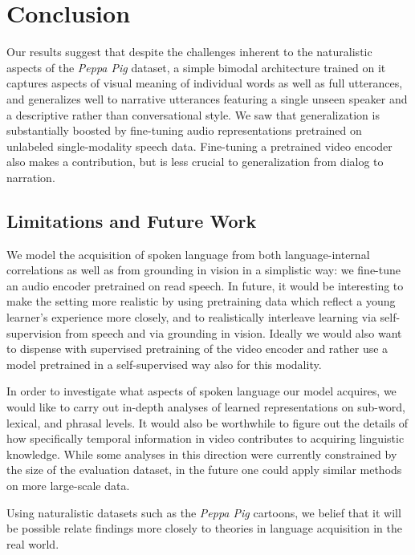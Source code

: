 \section{Conclusion}
\label{sec:conclusion}
Our results suggest that despite the challenges inherent to the
naturalistic aspects of the \emph{Peppa Pig} dataset, a simple bimodal
architecture trained on it captures aspects of visual meaning of individual 
words as well as full utterances, and generalizes well to narrative utterances
featuring a single unseen speaker and a descriptive rather than
conversational style. We saw that generalization is substantially
boosted by fine-tuning audio representations pretrained on unlabeled
single-modality speech data. Fine-tuning a pretrained video encoder
also makes a contribution, but is less crucial to generalization from
dialog to narration.


\subsection{Limitations and Future Work}
\label{sec:limitations}
We model the acquisition of spoken language from both
language-internal correlations as well as from grounding in vision in
a simplistic way: we fine-tune an audio encoder pretrained on read
speech.
In future, it would be interesting to make the setting
more realistic by using pretraining data which reflect a young
learner's experience more closely, and to realistically interleave learning via
self-supervision from speech and via grounding in vision.
Ideally we would also want to dispense with
supervised pretraining of the video encoder and rather use a model pretrained in a
self-supervised way also for this modality.

In order to investigate what aspects of spoken language our model
acquires, we would like to carry out in-depth analyses of learned 
representations on sub-word, lexical, and phrasal levels. It would also be 
worthwhile to figure out the details of how specifically temporal information 
in video contributes to acquiring linguistic knowledge. While some analyses in 
this direction were currently constrained by the size of the evaluation 
dataset, in the future one could apply similar methods on more large-scale data.

Using naturalistic datasets such as the \textit{Peppa Pig} cartoons, we belief 
that it will be possible relate findings more closely to theories in 
language acquisition in the real world.


